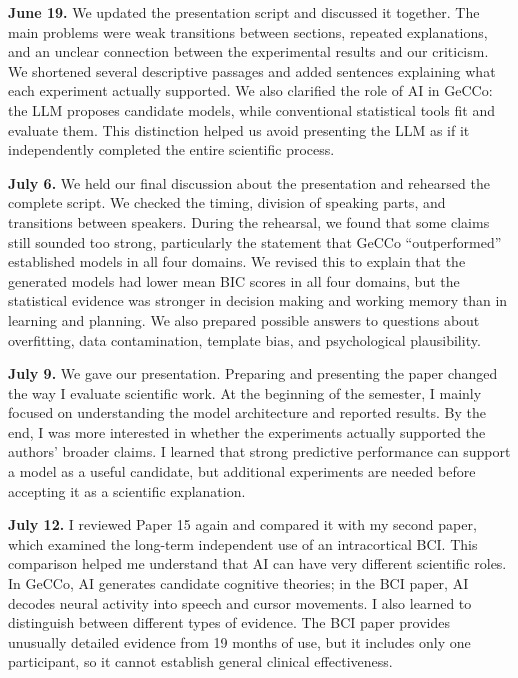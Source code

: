\textbf{June 19.} We updated the presentation script and discussed it together. The main problems were weak transitions between sections, repeated explanations, and an unclear connection between the experimental results and our criticism. We shortened several descriptive passages and added sentences explaining what each experiment actually supported. We also clarified the role of AI in GeCCo: the LLM proposes candidate models, while conventional statistical tools fit and evaluate them. This distinction helped us avoid presenting the LLM as if it independently completed the entire scientific process.
 
\textbf{July 6.} We held our final discussion about the presentation and rehearsed the complete script. We checked the timing, division of speaking parts, and transitions between speakers. During the rehearsal, we found that some claims still sounded too strong, particularly the statement that GeCCo ``outperformed'' established models in all four domains. We revised this to explain that the generated models had lower mean BIC scores in all four domains, but the statistical evidence was stronger in decision making and working memory than in learning and planning. We also prepared possible answers to questions about overfitting, data contamination, template bias, and psychological plausibility.
 
\textbf{July 9.} We gave our presentation. Preparing and presenting the paper changed the way I evaluate scientific work. At the beginning of the semester, I mainly focused on understanding the model architecture and reported results. By the end, I was more interested in whether the experiments actually supported the authors' broader claims. I learned that strong predictive performance can support a model as a useful candidate, but additional experiments are needed before accepting it as a scientific explanation.
 
\textbf{July 12.} I reviewed Paper 15 again and compared it with my second paper, which examined the long-term independent use of an intracortical BCI. This comparison helped me understand that AI can have very different scientific roles. In GeCCo, AI generates candidate cognitive theories; in the BCI paper, AI decodes neural activity into speech and cursor movements. I also learned to distinguish between different types of evidence. The BCI paper provides unusually detailed evidence from 19 months of use, but it includes only one participant, so it cannot establish general clinical effectiveness.
 
